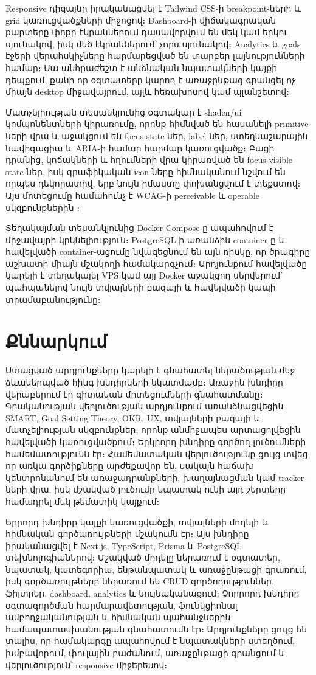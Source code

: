 Responsive դիզայնը իրականացվել է Tailwind CSS-ի breakpoint-ների և grid կառուցվածքների միջոցով։ Dashboard-ի վիճակագրական քարտերը փոքր էկրաններում դասավորվում են մեկ կամ երկու սյունակով, իսկ մեծ էկրաններում՝ չորս սյունակով։ Analytics և goals էջերի վերահսկիչները հարմարեցված են տարբեր լայնությունների համար։ Սա անհրաժեշտ է անձնական նպատակների կայքի դեպքում, քանի որ օգտատերը կարող է առաջընթաց գրանցել ոչ միայն desktop միջավայրում, այլև հեռախոսով կամ պլանշետով։

Մատչելիության տեսանկյունից օգտակար է shadcn/ui կոմպոնենտների կիրառումը, որոնք հիմնված են հասանելի primitive-ների վրա և աջակցում են focus state-ներ, label-ներ, ստեղնաշարային նավիգացիա և ARIA-ի համար հարմար կառուցվածք։ Բացի դրանից, կոճակների և հղումների վրա կիրառված են focus-visible state-ներ, իսկ գրաֆիկական icon-ները հիմնականում նշվում են որպես դեկորատիվ, երբ նույն իմաստը փոխանցվում է տեքստով։ Այս մոտեցումը համահունչ է WCAG-ի perceivable և operable սկզբունքներին \autocite{w3cWcag22}։

Տեղակայման տեսանկյունից Docker Compose-ը ապահովում է միջավայրի կրկնելիություն։ PostgreSQL-ի առանձին container-ը և հավելվածի container-ացումը նվազեցնում են այն ռիսկը, որ ծրագիրը աշխատի միայն մշակողի համակարգչում։ Արդյունքում հավելվածը կարելի է տեղակայել VPS կամ այլ Docker աջակցող սերվերում՝ պահպանելով նույն տվյալների բազայի և հավելվածի կապի տրամաբանությունը։

\section{Քննարկում}

Ստացված արդյունքները կարելի է գնահատել ներածության մեջ ձևակերպված հինգ խնդիրների նկատմամբ։ Առաջին խնդիրը վերաբերում էր գիտական մոտեցումների գնահատմանը։ Գրականության վերլուծության արդյունքում առանձնացվեցին SMART, Goal Setting Theory, OKR, UX, տվյալների բազայի և մատչելիության սկզբունքներ, որոնք անմիջապես արտացոլվեցին հավելվածի կառուցվածքում։ Երկրորդ խնդիրը գործող լուծումների համեմատությունն էր։ Համեմատական վերլուծությունը ցույց տվեց, որ առկա գործիքները արժեքավոր են, սակայն հաճախ կենտրոնանում են առաջադրանքների, խաղայնացման կամ tracker-ների վրա, իսկ մշակված լուծումը նպատակ ունի այդ շերտերը համադրել մեկ թեմատիկ կայքում։

Երրորդ խնդիրը կայքի կառուցվածքի, տվյալների մոդելի և հիմնական գործառույթների մշակումն էր։ Այս խնդիրը իրականացվել է Next.js, TypeScript, Prisma և PostgreSQL տեխնոլոգիաներով։ Մշակված մոդելը ներառում է օգտատեր, նպատակ, կատեգորիա, ենթանպատակ և առաջընթացի գրառում, իսկ գործառույթները ներառում են CRUD գործողություններ, ֆիլտրեր, dashboard, analytics և նույնականացում։ Չորրորդ խնդիրը օգտագործման հարմարավետության, ֆունկցիոնալ ամբողջականության և հիմնական պահանջներին համապատասխանության գնահատումն էր։ Արդյունքները ցույց են տալիս, որ համակարգը ապահովում է նպատակների ստեղծում, խմբավորում, փուլային բաժանում, առաջընթացի գրանցում և վերլուծություն՝ responsive միջերեսով։

